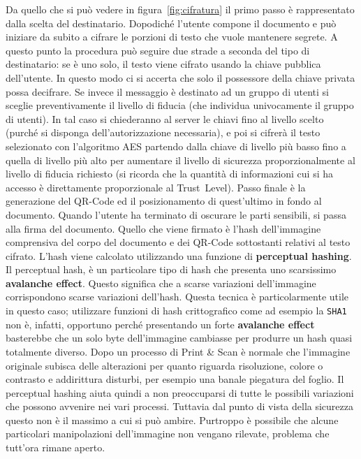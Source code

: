 Da quello che si può vedere in figura~\ref{fig:cifratura} il primo passo è rappresentato dalla scelta del destinatario. Dopodiché l'utente compone il documento e può iniziare da subito a cifrare le porzioni di testo che vuole mantenere segrete.
A questo punto la procedura può seguire due strade a seconda del tipo di destinatario: se è uno solo, il testo viene cifrato usando la chiave pubblica dell'utente. In questo modo ci si accerta che solo il possessore della chiave privata possa decifrare. Se invece il messaggio è destinato ad un gruppo di utenti si sceglie preventivamente il livello di fiducia (che individua univocamente il gruppo di utenti). In tal caso si chiederanno al server le chiavi fino al livello scelto (purché si disponga dell'autorizzazione necessaria), e poi si cifrerà il testo selezionato con l'algoritmo AES partendo dalla chiave di livello più basso fino a quella di livello più alto per aumentare il livello di sicurezza proporzionalmente al livello di fiducia richiesto (si ricorda che la quantità di informazioni cui si ha accesso è direttamente proporzionale al Trust~Level). Passo finale è la generazione del QR-Code ed il posizionamento di quest'ultimo in fondo al documento.
Quando l'utente ha terminato di oscurare le parti sensibili, si passa alla firma del documento.
Quello che viene firmato è l'hash dell'immagine comprensiva del corpo del documento e dei QR-Code sottostanti relativi al testo cifrato.
L'hash viene calcolato utilizzando una funzione di \textbf{perceptual hashing}. Il perceptual hash, è un particolare tipo di hash che presenta uno scarsissimo \textbf{avalanche effect}. Questo significa che a scarse variazioni dell'immagine corrispondono scarse variazioni dell'hash. Questa tecnica è particolarmente utile in questo caso; utilizzare funzioni di hash crittografico come ad esempio la \texttt{SHA1} non è, infatti, opportuno perché presentando un forte \textbf{avalanche effect} basterebbe che un solo byte dell'immagine cambiasse per produrre un hash quasi totalmente diverso. Dopo un processo di Print \& Scan è normale che l'immagine originale subisca delle alterazioni per quanto riguarda risoluzione, colore o contrasto e addirittura disturbi, per esempio una banale piegatura del foglio. Il perceptual hashing aiuta quindi a non preoccuparsi di tutte le possibili variazioni che possono avvenire nei vari processi.
Tuttavia dal punto di vista della sicurezza questo non è il massimo a cui si può ambire. Purtroppo è possibile che alcune particolari manipolazioni dell'immagine non vengano rilevate, problema che tutt'ora rimane aperto.  %

